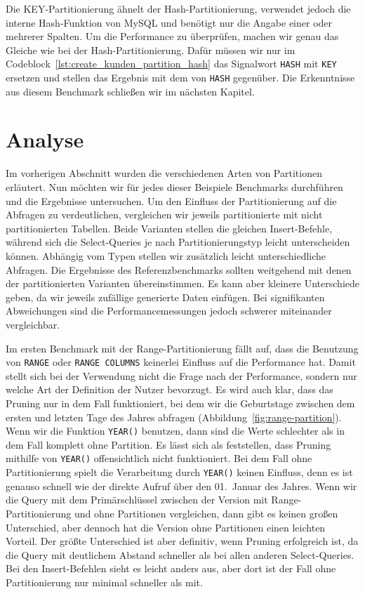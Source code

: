 Die KEY-Partitionierung ähnelt der Hash-Partitionierung, verwendet jedoch die interne Hash-Funktion von MySQL und benötigt nur die Angabe einer oder mehrerer Spalten.
Um die Performance zu überprüfen, machen wir genau das Gleiche wie bei der Hash-Partitionierung.
Dafür müssen wir nur im Codeblock~\ref{lst:create_kunden_partition_hash} das Signalwort \texttt{HASH} mit \texttt{KEY} ersetzen und stellen das Ergebnis mit dem von \texttt{HASH} gegenüber.
Die Erkenntnisse aus diesem Benchmark schließen wir im nächsten Kapitel.

\section{Analyse}\label{sec:partition-analyse}

Im vorherigen Abschnitt wurden die verschiedenen Arten von Partitionen erläutert.
Nun möchten wir für jedes dieser Beispiele Benchmarks durchführen und die Ergebnisse untersuchen.
Um den Einfluss der Partitionierung auf die Abfragen zu verdeutlichen, vergleichen wir jeweils partitionierte mit nicht partitionierten Tabellen.
Beide Varianten stellen die gleichen Insert-Befehle, während sich die Select-Queries je nach Partitionierungstyp leicht unterscheiden können.
Abhängig vom Typen stellen wir zusätzlich leicht unterschiedliche Abfragen.
Die Ergebnisse des Referenzbenchmarks sollten weitgehend mit denen der partitionierten Varianten übereinstimmen.
Es kann aber kleinere Unterschiede geben, da wir jeweils zufällige generierte Daten einfügen.
Bei signifikanten Abweichungen sind die Performancemessungen jedoch schwerer miteinander vergleichbar.

Im ersten Benchmark mit der Range-Partitionierung fällt auf, dass die Benutzung von \texttt{RANGE} oder \texttt{RANGE COLUMNS} keinerlei Einfluss auf die Performance hat.
Damit stellt sich bei der Verwendung nicht die Frage nach der Performance, sondern nur welche Art der Definition der Nutzer bevorzugt.
Es wird auch klar, dass das Pruning nur in dem Fall funktioniert, bei dem wir die Geburtstage zwischen dem ersten und letzten Tage des Jahres abfragen (Abbildung~\ref{fig:range-partition}).
Wenn wir die Funktion \texttt{YEAR()} benutzen, dann sind die Werte schlechter als in dem Fall komplett ohne Partition.
Es lässt sich als feststellen, dass Pruning mithilfe von \texttt{YEAR()} offensichtlich nicht funktioniert.
Bei dem Fall ohne Partitionierung spielt die Verarbeitung durch \texttt{YEAR()} keinen Einfluss, denn es ist genauso schnell wie der direkte Aufruf über den 01.\ Januar des Jahres.
Wenn wir die Query mit dem Primärschlüssel zwischen der Version mit Range-Partitionierung und ohne Partitionen vergleichen, dann gibt es keinen großen Unterschied, aber dennoch hat die Version ohne Partitionen einen leichten Vorteil.
Der größte Unterschied ist aber definitiv, wenn Pruning erfolgreich ist, da die Query mit deutlichem Abstand schneller als bei allen anderen Select-Queries.
Bei den Insert-Befehlen sieht es leicht anders aus, aber dort ist der Fall ohne Partitionierung nur minimal schneller als mit.

